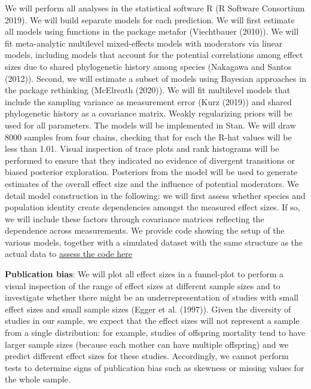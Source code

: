 \documentclass[]{article}
\begin{document}
We will perform all analyses in the statistical software R (R Software
Consortium 2019). We will build separate models for each prediction. We
will first estimate all models using functions in the package metafor
(Viechtbauer (2010)). We will fit meta-analytic multilevel mixed-effects
models with moderators via linear models, including models that account
for the potential correlations among effect sizes due to shared
phylogenetic history among species (Nakagawa and Santos (2012)). Second,
we will estimate a subset of models using Bayesian approaches in the
package rethinking (McElreath (2020)). We will fit multilevel models
that include the sampling variance as measurement error (Kurz (2019))
and shared phylogenetic history as a covariance matrix. Weakly
regularizing priors will be used for all parameters. The models will be
implemented in Stan. We will draw 8000 samples from four chains,
checking that for each the R-hat values will be less than 1.01. Visual
inspection of trace plots and rank histograms will be performed to
ensure that they indicated no evidence of divergent transitions or
biased posterior exploration. Posteriors from the model will be used to
generate estimates of the overall effect size and the influence of
potential moderators. We detail model construction in the following: we
will first assess whether species and population identity create
dependencies amongst the measured effect sizes. If so, we will include
these factors through covariance matrices reflecting the dependence
across measurements. We provide code showing the setup of the various
models, together with a simulated dataset with the same structure as the
actual data to
\href{https://github.com/dieterlukas/FemaleDominanceReproduction_MetaAnalysis}{assess
the code here}

\textbf{Publication bias}: We will plot all effect sizes in a
funnel-plot to perform a visual inspection of the range of effect sizes
at different sample sizes and to investigate whether there might be an
underrepresentation of studies with small effect sizes and small sample
sizes (Egger et al. (1997)). Given the diversity of studies in our
sample, we expect that the effect sizes will not represent a sample from
a single distribution: for example, studies of offspring mortality tend
to have larger sample sizes (because each mother can have multiple
offspring) and we predict different effect sizes for these studies.
Accordingly, we cannot perform tests to determine signs of publication
bias such as skewness or missing values for the whole sample.
\end{document}
